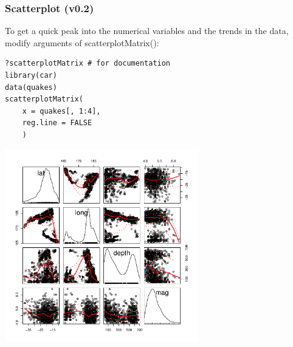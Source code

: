 \begin{frame}
\frametitle{Scatterplot (v0.2)}

To get a quick peak into the numerical variables and the trends in the data, modify arguments of \ttfamily scatterplotMatrix(): \normalfont
  		\begin{lstlisting}
?scatterplotMatrix # for documentation
library(car)		
data(quakes)
scatterplotMatrix(
	x = quakes[, 1:4], 
	reg.line = FALSE
	)
		\end{lstlisting}

        \begin{center}
         \includegraphics[width=0.63\textwidth]{images/scatterPlot_v1.pdf}
        \end{center}
\end{frame}

